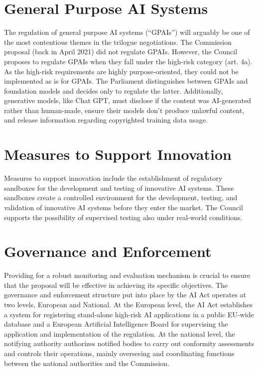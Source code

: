 \section{General Purpose AI Systems} \label{sec:GPAI-sys}
The regulation of general purpose AI systems (“GPAIs”) will arguably be one of the most contentious themes in the trilogue negotiations. The Commission proposal (back in April 2021) did not regulate GPAIs. However, the Council proposes to regulate GPAIs when they fall under the high-risk category (art. 4a). As the high-risk requirements are highly purpose-oriented, they could not be implemented as is for GPAIs. The Parliament distinguishes between GPAIs and foundation models and decides only to regulate the latter. Additionally, generative models, like Chat GPT, must disclose if the content was AI-generated rather than human-made, ensure their models don't produce unlawful content, and release information regarding copyrighted training data usage.

\section{Measures to Support Innovation}
Measures to support innovation include the establishment of regulatory sandboxes for the development and testing of innovative AI systems. These sandboxes create a controlled environment for the development, testing, and validation of innovative AI systems before they enter the market. The Council supports the possibility of supervised testing also under real-world conditions.

\section{Governance and Enforcement}
Providing for a robust monitoring and evaluation mechanism is crucial to ensure that the proposal will be effective in achieving its specific objectives. The governance and enforcement structure put into place by the AI Act operates at two levels, European and National. At the European level, the AI Act establishes a system for registering stand-alone high-risk AI applications in a public EU-wide database and a European Artificial Intelligence Board for supervising the application and implementation of the regulation. At the national level, the notifying authority authorizes notified bodies to carry out conformity assessments and controls their operations, mainly overseeing and coordinating functions between the national authorities and the Commission.